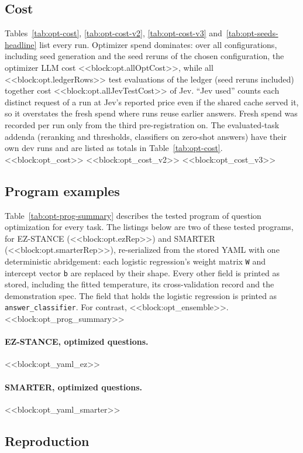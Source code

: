 \subsection{Cost}\label{app:opt-cost}
Tables~\ref{tab:opt-cost}, \ref{tab:opt-cost-v2}, \ref{tab:opt-cost-v3} and~\ref{tab:opt-seeds-headline} list every run. Optimizer spend dominates: over all configurations, including seed generation and the seed reruns of the chosen configuration, the optimizer LLM cost <<block:opt.allOptCost>>, while all <<block:opt.ledgerRows>> test evaluations of the ledger (seed reruns included) together cost <<block:opt.allJevTestCost>> of Jev. ``Jev used'' counts each distinct request of a run at Jev's reported price even if the shared cache served it, so it overstates the fresh spend where runs reuse earlier answers. Fresh spend was recorded per run only from the third pre-registration on. The evaluated-task addenda (reranking and thresholds, classifiers on zero-shot answers) have their own dev runs and are listed as totals in Table~\ref{tab:opt-cost}.
<<block:opt_cost>>
<<block:opt_cost_v2>>
<<block:opt_cost_v3>>

\subsection{Program examples}\label{app:opt-programs}
Table~\ref{tab:opt-prog-summary} describes the tested program of question optimization for every task. The listings below are two of these tested programs, for EZ-STANCE (<<block:opt.ezRep>>) and SMARTER (<<block:opt.smarterRep>>), re-serialized from the stored YAML with one deterministic abridgement: each logistic regression's weight matrix \texttt{W} and intercept vector \texttt{b} are replaced by their shape. Every other field is printed as stored, including the fitted temperature, its cross-validation record and the demonstration spec. The field that holds the logistic regression is printed as \texttt{answer\_classifier}. For contrast, <<block:opt_ensemble>>.
<<block:opt_prog_summary>>
\paragraph{EZ-STANCE, optimized questions.}
<<block:opt_yaml_ez>>
\paragraph{SMARTER, optimized questions.}
<<block:opt_yaml_smarter>>

\subsection{Reproduction}\label{app:opt-repro}
